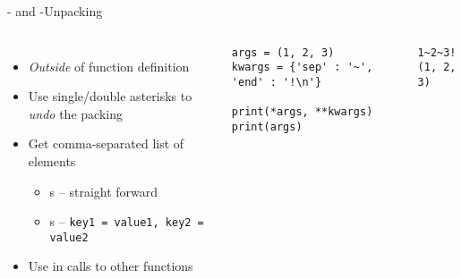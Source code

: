 \begin{frame}[fragile]{- and -Unpacking}
%

\begin{columns}[t]
\begin{itemize}
\item \emph{Outside} of function definition
\item Use single/double asterisks to \emph{undo} the packing
\item Get comma-separated list of elements
	\begin{itemize}
	\item {}s -- straight forward
	\item {}s -- \texttt{key1 = value1, key2 = value2}
	\end{itemize}
\item Use in calls to other functions
\end{itemize}
%
\begin{codebox}
\begin{verbatim}
args = (1, 2, 3)
kwargs = {'sep' : '~', 'end' : '!\n'}

print(*args, **kwargs)
print(args)
\end{verbatim}
\end{codebox}
%
\begin{cmdbox}
\begin{verbatim}
1~2~3!
(1, 2, 3)
\end{verbatim}
\end{cmdbox}
\end{columns}
%
\end{frame}


